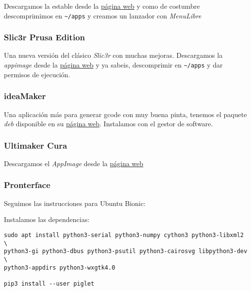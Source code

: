 \documentclass[
  12pt,
  spanish,
]{article}
\begin{document}
Descargamos la estable desde la \href{https://dl.slic3r.org}{página web}
y como de costumbre descomprimimos en \texttt{\textasciitilde{}/apps} y
creamos un lanzador con \emph{MenuLibre}

\hypertarget{slic3r-prusa-edition}{%
\subsubsection{Slic3r Prusa Edition}\label{slic3r-prusa-edition}}

Una nueva versión del clásico \emph{Slic3r} con muchas mejoras.
Descargamos la \emph{appimage} desde la
\href{https://www.prusa3d.com/slic3r-prusa-edition/}{página web} y ya
sabeis, descomprimir en \texttt{\textasciitilde{}/apps} y dar permisos
de ejecución.

\hypertarget{ideamaker}{%
\subsubsection{ideaMaker}\label{ideamaker}}

Una aplicación más para generar gcode con muy buena pinta, tenemos el
paquete \emph{deb} disponible en su
\href{https://www.raise3d.com/pages/ideamaker}{página web}. Instalamos
con el gestor de software.

\hypertarget{ultimaker-cura}{%
\subsubsection{Ultimaker Cura}\label{ultimaker-cura}}

Descargamos el \emph{AppImage} desde la
\href{https://github.com/Ultimaker/Cura/releases}{página web}

\hypertarget{pronterface}{%
\subsubsection{Pronterface}\label{pronterface}}

Seguimos las instrucciones para Ubuntu Bionic:

Instalamos las dependencias:

\begin{verbatim}
sudo apt install python3-serial python3-numpy cython3 python3-libxml2 \
python3-gi python3-dbus python3-psutil python3-cairosvg libpython3-dev \
python3-appdirs python3-wxgtk4.0

pip3 install --user piglet
\end{verbatim}
\end{document}
